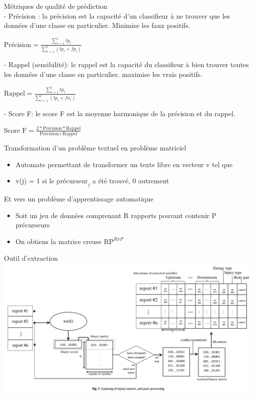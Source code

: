 \begin{frame}	
	
	Métriques de qualité de prédiction\\
	- Précision : la précision est la capacité d'un classifieur à ne trouver que les données d'une classe en particulier. Minimise les faux positifs.	\begin{center}
		$\textrm{Précision} = \frac{\sum_{i=1}^{l} tp_i}{\sum_{i=1}^{l} (tp_i + fp_i)}$
	\end{center}
	
	- Rappel (sensibilité): le rappel est la capacité du classifieur à bien trouver toutes les données d'une classe en particulier. maximise les vrais positifs.
		\begin{center}
		$\textrm{Rappel} = \frac{\sum_{i=1}^{l} tp_i}{\sum_{i=1}^{l} (tp_i + fn_i)}$
	\end{center}
	
	- Score F: le score F est la moyenne harmonique de la précision et du rappel. 
	\begin{center}
		$\textrm{Score F} = \frac{2 * \textrm{Précision} * \textrm{Rappel}}{\textrm{Précision} + \textrm{Rappel}}$ 
	\end{center}
	
\end{frame}




\begin{frame}	
	Transformation d'un problème textuel en problème matriciel
	\begin{itemize}
		\item Automate permettant de transformer un texte libre en vecteur v tel que
		\item v(j) = 1 si le $\textrm{précurseur}_j$ a été trouvé, 0 autrement 
	\end{itemize}
	
	Et vers un problème d'apprentissage automatique
	\begin{itemize}
		\item Soit un jeu de données comprenant R rapports pouvant contenir P précurseurs
		\item On obtiens la matrice creuse $\textrm{RP}^{RxP}$
	\end{itemize}
\end{frame}



\begin{frame}	
	Outil d'extraction
	\includegraphics[width=\paperwidth]{rtool}
\end{frame}


